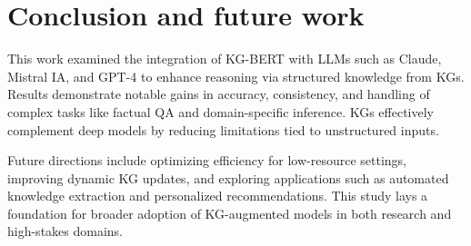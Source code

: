 \documentclass[conference]{IEEEtran}
\begin{document}
\section{Conclusion and future work}
\label{sec:CONC}

This work examined the integration of KG-BERT with LLMs such as Claude, Mistral IA, and GPT-4 to enhance reasoning via structured knowledge from KGs. Results demonstrate notable gains in accuracy, consistency, and handling of complex tasks like factual QA and domain-specific inference. KGs effectively complement deep models by reducing limitations tied to unstructured inputs.

Future directions include optimizing efficiency for low-resource settings, improving dynamic KG updates, and exploring applications such as automated knowledge extraction and personalized recommendations. This study lays a foundation for broader adoption of KG-augmented models in both research and high-stakes domains.
\end{document}

